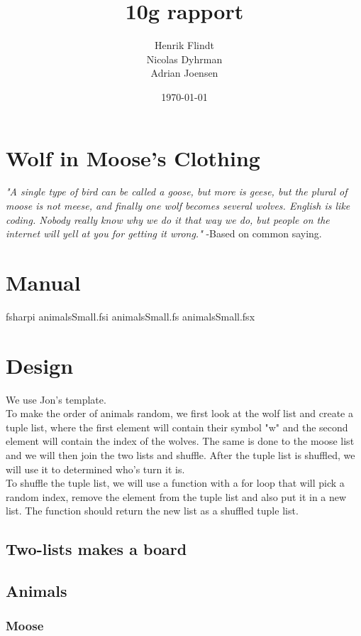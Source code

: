 \documentclass{article}
\title{10g rapport}
\author{Henrik Flindt\\Nicolas Dyhrman\\Adrian Joensen}
\date{\today}
\begin{document}
    \maketitle
    
    \section*{Wolf in Moose's Clothing}
    \textit{"A single type of bird can be called a goose, but more is geese, but the plural of moose is not meese, and finally one wolf becomes several wolves. English is like coding. Nobody really know why we do it that way we do, but people on the internet will yell at you for getting it wrong."} \newline -Based on common saying.
    \section{Manual}
   		fsharpi animalsSmall.fsi animalsSmall.fs animalsSmall.fsx
    
    \section{Design}
    	We use Jon's template.
    	\\
    	To make the order of animals random, we first look at the wolf list and create a tuple list, where the first element will contain their symbol "w" and the second element will contain the index of the wolves. The same is done to the moose list and we will then join the two lists and shuffle. After the tuple list is shuffled, we will use it to determined who's turn it is.
    	\\
    	To shuffle the tuple list, we will use a function with a for loop that will pick a random index, remove the element from the tuple list and also put it in a new list. The function should return the new list as a shuffled tuple list.
    	\\
    \subsection{Two-lists makes a board}
    \subsection{Animals}
    \subsubsection{Moose}
\end{document}

